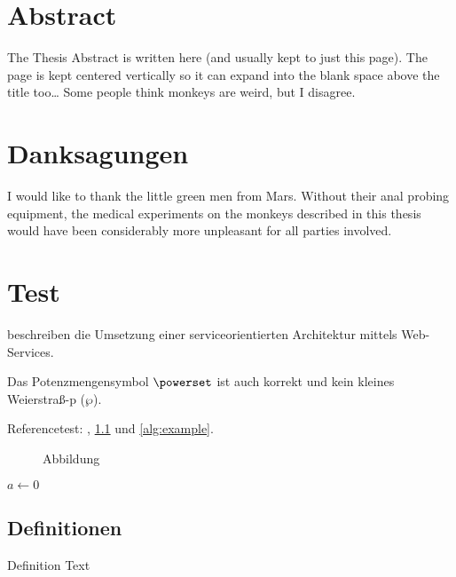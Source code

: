 \documentclass[paper=a5,twoside,fontsize=10pt, DIV=calc, headings=small,bibliography=totoc, listof=totoc]{scrbook}
\begin{document}
\chapter*{Abstract}
The Thesis Abstract is written here (and usually kept to just this page). The page is kept centered vertically so it can expand into the blank space above the title too\ldots
Some people think monkeys are weird, but I disagree.
\clearpage

\chapter*{Danksagungen}
I would like to thank the little green men from Mars. Without their anal probing equipment, the medical experiments on the monkeys described in this thesis would have been considerably more unpleasant for all parties involved.
\clearpage

\pagestyle{scrheadings}

\chapter{Test}
\label{chap:test}

\citeauthor{WSPA} \cite{WSPA} beschreiben die Umsetzung einer serviceorientierten Architektur mittels Web-Services.

Das Potenzmengensymbol $\powerset$ ist auch korrekt und kein kleines Weierstraß-p ($\wp$).


Referencetest: , \cref{fig:Abbildung} und \cref{alg:example}.

\begin{figure}
\missingfigure{}
\caption{Abbildung}
\label{fig:Abbildung}
\end{figure}

\begin{algorithm}
\caption{$algo$}
\label{alg:example}
\begin{algorithmic}[1]
\State $a \gets 0$
\end{algorithmic}
\end{algorithm}

\section{Definitionen}
\begin{definition}[Title]
\label{def:def1}
Definition Text
\end{definition}
\end{document}
